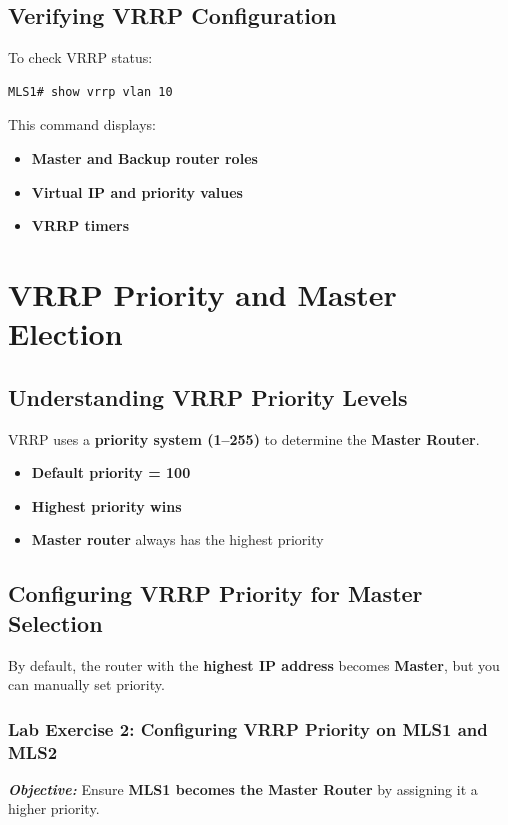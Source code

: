 \documentclass[a4paper]{book}
\begin{document}
\subsection{Verifying VRRP Configuration}
To check VRRP status:
\begin{lstlisting}
MLS1# show vrrp vlan 10
\end{lstlisting}
This command displays:
\begin{itemize}
\item \textbf{Master and Backup router roles}
\item \textbf{Virtual IP and priority values}
\item \textbf{VRRP timers}
\end{itemize}


\vspace{1.5em}

\section{VRRP Priority and Master Election}

\subsection{Understanding VRRP Priority Levels}
VRRP uses a \textbf{priority system (1--255)} to determine the \textbf{Master Router}.
\begin{itemize}
\item \textbf{Default priority = 100}
\item \textbf{Highest priority wins}
\item \textbf{Master router} always has the highest priority
\end{itemize}

\subsection{Configuring VRRP Priority for Master Selection}
By default, the router with the \textbf{highest IP address} becomes \textbf{Master}, but you can 
manually set priority.

\subsubsection{Lab Exercise 2: Configuring VRRP Priority on MLS1 and MLS2}
\textbf{\textit{Objective:}} Ensure \textbf{MLS1 becomes the Master Router} by assigning it a 
higher priority.
\vspace{1.5em}
\end{document}
